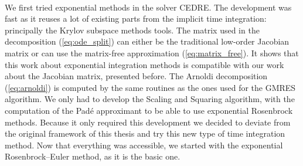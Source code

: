     \paragraph{}
    We first tried exponential methods in the solver CEDRE.
    The development was fast as it reuses a lot of existing parts from the implicit time integration: principally the Krylov subspace methods tools.
    The matrix used in the decomposition (\ref{eq:ode_split}) can either be the traditional low-order Jacobian matrix or can use the matrix-free approximation (\ref{eq:matrix_free}).
    It shows that this work about exponential integration methods is compatible with our work about the Jacobian matrix, presented before.
    The Arnoldi decomposition (\ref{eq:arnoldi}) is computed by the same routines as the ones used for the GMRES algorithm.
    We only had to develop the Scaling and Squaring algorithm, with the computation of the Padé approximant to be able to use exponential Rosenbrock methods.
    Because it only required this development we decided to deviate from the original framework of this thesis and try this new type of time integration method.
    Now that everything was accessible, we started with the exponential Rosenbrock--Euler method, as it is the basic one.

